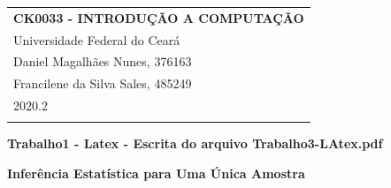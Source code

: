\documentclass[a4paper,12pt]{article} %
\begin{document}
	
	
	\thispagestyle{empty} %
	
	\begin{tabular}{p{15.5cm}} %
		{\large \bf CK0033 - INTRODUÇÃO A COMPUTAÇÃO} \\
		 Universidade Federal do Ceará \\ 
		 Daniel Magalhães Nunes, 376163 \\
		 Francilene da Silva Sales, 485249 \\ 2020.2 \\
		\hline %
		\\
	\end{tabular} %
	\vspace*{0.3cm} %
	
	\begin{center} %
		{\Large \bf Trabalho1 - Latex - Escrita do arquivo Trabalho3-LAtex.pdf} %
		\vspace{2mm}
		
	\end{center}  
	
	\vspace{0.4cm}
	\vspace*{0.3cm} %
	
	
	\begin{center}	
		{\Large \bf Inferência Estatística para Uma Única Amostra}
	\end{center}
	
	\vspace{0,4cm}
	
	
	
\end{document}
